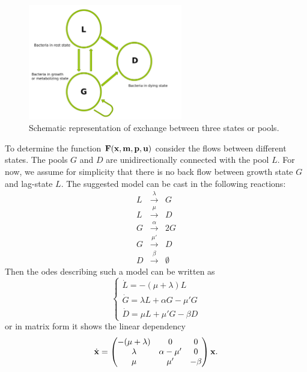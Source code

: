 \documentclass[10pt,A4paper]{article}
\begin{document}
\begin{figure}[t]
    \begin{center}
    \includegraphics[width=0.6\textwidth]{Figures/TPM_fig.pdf}
    \caption{Schematic representation of exchange between three states or pools.}
    \label{fig:SchematicRep}
    \end{center}
\end{figure}
To determine the function $\mathbf{F}(\mathbf{x}, \mathbf{m}, \mathbf{p}, \mathbf{u})$ consider the flows between different states.
The pools $G$ and $D$ are unidirectionally connected with the pool $L$.
For now, we assume for simplicity that there is no back flow between growth state $G$ and lag-state $L$.
The suggested model can be cast in the following reactions:
\begin{eqnarray}
    L &\stackrel{\lambda}{\longrightarrow} & G\\
    L &\stackrel{\mu}{\longrightarrow} & D\\
    G &\stackrel{\alpha}{\longrightarrow} & 2G\\
    G &\stackrel{\mu'}{\longrightarrow} & D\\
    D &\stackrel{\beta}{\longrightarrow} & \emptyset
\end{eqnarray}
Then the \acp{ode} describing such a model can be written as
\begin{equation}
\begin{cases}
    \dot{L} = -(\mu + \lambda) L\\
    \dot{G} = \lambda L + \alpha G - \mu' G\\
    \dot{D} = \mu  L + \mu' G- \beta D  
\end{cases}
\end{equation}
or in matrix form it shows the linear dependency
\begin{equation}
    \dot {\mathbf{x}}  = \begin{pmatrix}
        -(\mu + \lambda) & 0             & 0      \\
        \lambda          & \alpha - \mu' & 0      \\
        \mu              & \mu'          & -\beta 
    \end{pmatrix} \mathbf{x} .
\end{equation}
%
%
%
\end{document}
